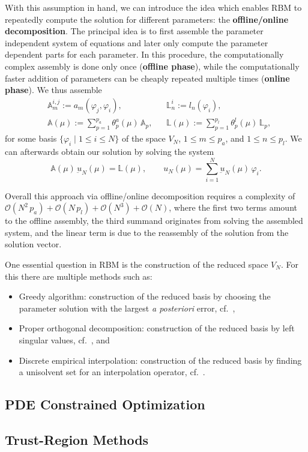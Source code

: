 With this assumption in hand, we can introduce the idea which enables RBM to repeatedly compute the solution for different parameters: the \textbf{offline/online decomposition}.
The principal idea is to first assemble the parameter independent system of equations and later only compute the parameter dependent parts for each parameter.
In this procedure, the computationally complex assembly is done only once (\textbf{offline phase}), while the computationally faster addition of parameters can be cheaply repeated multiple times (\textbf{online phase}).
We thus assemble
\begin{align*}\label{OffOnComp}
    &\mathbb{A}^{i, j}_m := a_m(\varphi_j, \varphi_i), &&\mathbb{L}^i_n := l_n(\varphi_i), \tag*{(offline)} \\
    &\mathbb{A}(\mu) := \sum\limits_{p = 1}^{p_a} \theta_p^a(\mu)\, \mathbb{A}_p, &&\mathbb{L}(\mu) := \sum\limits_{p = 1}^{p_l} \theta_p^l(\mu)\, \mathbb{L}_p, \tag*{(online)}
\end{align*}
for some basis $\{ \varphi_i \; | \; 1 \leq i \leq N \}$ of the space $V_N$, $1 \leq m \leq p_a$, and $1 \leq n \leq p_l$.
We can afterwards obtain our solution by solving the system
\begin{equation*}\label{OnOffSystem}
    \mathbb{A}(\mu)\, \underbar{u}_N(\mu) = \mathbb{L}(\mu), \qquad u_N(\mu) = \sum\limits_{i = 1}^N \underbar{u}_N(\mu)\, \varphi_i.
\end{equation*}

Overall this approach via offline/online decomposition requires a complexity of $\mathcal{O}(N^2 \, p_a) + \mathcal{O}(N \, p_l) + \mathcal{O}(N^3) + \mathcal{O}(N)$, where the first two terms amount to the offline assembly, the third summand originates from solving the assembled system, and the linear term is due to the reassembly of the solution from the solution vector.

One essential question in RBM is the construction of the reduced space $V_N$. For this there are multiple methods such as:
\begin{itemize}
    \item Greedy algorithm: construction of the reduced basis by choosing the parameter solution with the largest \textit{a posteriori} error, cf.~\cite{DeVore2013, Veroy2003},
    \item Proper orthogonal decomposition: construction of the reduced basis by left singular values, cf.~\cite{Kunisch2001, Haasdonk2008}, and
    \item Discrete empirical interpolation: construction of the reduced basis by finding a unisolvent set for an interpolation operator, cf.~\cite{Barrault2004, Carlberg2011, Chaturantabut2010, Drohmann2012}.
\end{itemize}


\subsection{PDE Constrained Optimization}



\subsection{Trust-Region Methods}

